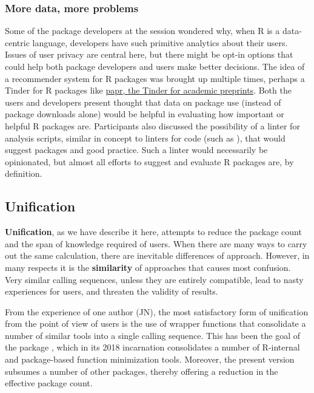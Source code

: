 \hypertarget{more-data-more-problems}{%
\subsubsection{More data, more problems}\label{more-data-more-problems}}

Some of the package developers at the session wondered why, when R is a
data-centric language, developers have such primitive analytics about
their users. Issues of user privacy are central here, but there might be
opt-in options that could help both package developers and users make
better decisions. The idea of a recommender system for R packages was
brought up multiple times, perhaps a Tinder for R packages like
\href{https://simplystatistics.org/2016/10/03/papr/}{papr, the Tinder
for academic preprints}. Both the users and developers present thought
that data on package use (instead of package downloads alone) would be
helpful in evaluating how important or helpful R packages are.
Participants also discussed the possibility of a linter for analysis
scripts, similar in concept to linters for code (such as \citet{lintr}),
that would suggest packages and good practice. Such a linter would
necessarily be opinionated, but almost all efforts to suggest and
evaluate R packages are, by definition.

\hypertarget{unification}{%
\subsection{Unification}\label{unification}}

\textbf{Unification}, as we have describe it here, attempts to reduce
the package count and the span of knowledge required of users. When
there are many ways to carry out the same calculation, there are
inevitable differences of approach. However, in many respects it is the
\textbf{similarity} of approaches that causes most confusion. Very
similar calling sequences, unless they are entirely compatible, lead to
nasty experiences for users, and threaten the validity of results.

From the experience of one author (JN), the most satisfactory form of
unification from the point of view of users is the use of wrapper
functions that consolidate a number of similar tools into a single
calling sequence. This has been the goal of the package
, which in its 2018 incarnation consolidates a number of
R-internal and package-based function minimization tools. Moreover, the
present version subsumes a number of other packages, thereby offering a
reduction in the effective package count.

